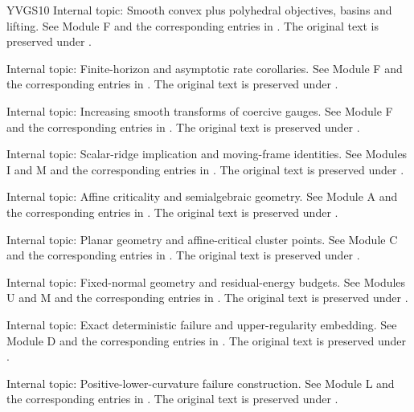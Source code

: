 \begin{thebibliography}{YVGS10}
 Internal topic: Smooth convex plus polyhedral objectives, basins and lifting. See Module F and the corresponding entries in . The original text is preserved under .

 Internal topic: Finite-horizon and asymptotic rate corollaries. See Module F and the corresponding entries in . The original text is preserved under .

 Internal topic: Increasing smooth transforms of coercive gauges. See Module F and the corresponding entries in . The original text is preserved under .

 Internal topic: Scalar-ridge implication and moving-frame identities. See Modules I and M and the corresponding entries in . The original text is preserved under .

 Internal topic: Affine criticality and semialgebraic geometry. See Module A and the corresponding entries in . The original text is preserved under .

 Internal topic: Planar geometry and affine-critical cluster points. See Module C and the corresponding entries in . The original text is preserved under .

 Internal topic: Fixed-normal geometry and residual-energy budgets. See Modules U and M and the corresponding entries in . The original text is preserved under .

 Internal topic: Exact deterministic failure and upper-regularity embedding. See Module D and the corresponding entries in . The original text is preserved under .

 Internal topic: Positive-lower-curvature failure construction. See Module L and the corresponding entries in . The original text is preserved under .

\end{thebibliography}
